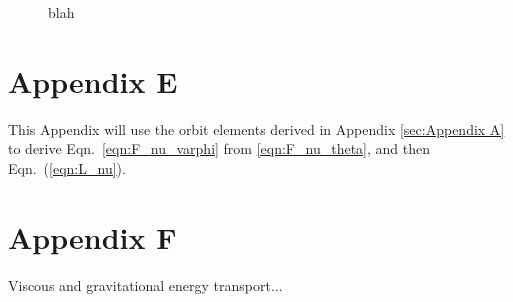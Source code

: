 \documentclass[preprint]{aastex62}
\begin{document}
\begin{figure}
    \caption{
        \label{fig:de_prime_nogravity}
        blah
    }
\end{figure}

\section{Appendix E}
\label{sec:Appendix E}

This Appendix will use the orbit elements derived in Appendix \ref{sec:Appendix A} to
derive Eqn.\ \ref{eqn:F_nu_varphi} from \ref{eqn:F_nu_theta}, and then Eqn.\ (\ref{eqn:L_nu}).

\section{Appendix F}
\label{sec:Appendix F}

Viscous and gravitational energy transport...



\end{document}
